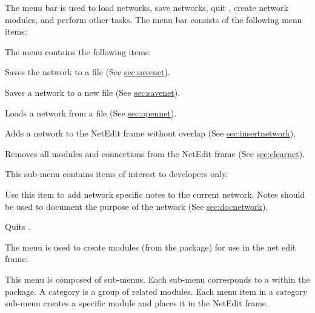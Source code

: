\begin{description}
   The menu bar is used to load networks, save
  networks, quit \sr{}, create network modules, and perform other
  tasks.  The menu bar consists of the following menu items:

  \begin{description}
     The  menu contains the following items:

    \begin{description}
       Saves the network to a file (See \hyperref{this
        section}{Section~}{}{sec:savenet}). 

       Saves a network to a new file (See
      \hyperref{this section}{Section~}{}{sec:savenet}).
      
       Loads a network from a file (See
      \hyperref{this section}{Section~}{}{sec:opennet}).
      
       Adds a network to the NetEdit frame
      without overlap (See \hyperref{this
        section}{Section~}{}{sec:insertnetwork}).
      
       Removes all modules and connections from
      the NetEdit frame (See \hyperref{this
        section}{Section~}{}{sec:clearnet}).
      
       This sub-menu contains items of interest to
      developers only.
      
       Use this item to add network specific
      notes to the current network.  Notes should be used to document
      the purpose of the network (See \hyperref{this
        section}{Section~}{}{sec:docnetwork}).
    
       Quits \sr{}.
    \end{description}
  \end{description}
  
  \begin{description}
     The  menu is used to create modules
    (from the \sr{} package) for use in the net edit frame.

    This menu is
    composed of sub-menus. Each sub-menu corresponds to a 
     within the \sr{} package.  A category is a group of
    related modules.  Each menu item in a category sub-menu creates a
    specific module and places it in the NetEdit frame.  


\end{description}
\end{description}
